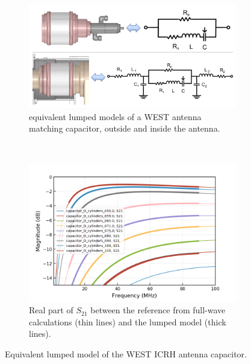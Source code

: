\documentclass{aip-cp}
\begin{document}
	\begin{figure}[t!]
		\centering
		\begin{subfigure}[t]{0.49\textwidth}
			\centering
			\includegraphics[width=.95\textwidth]{figures/capacitor_equivalent_circuit}
			\caption{equivalent lumped models of a WEST antenna matching capacitor, outside and inside the antenna.}
		\end{subfigure}%
		~
		\begin{subfigure}[t]{0.49\textwidth}
			\centering
			\includegraphics[width=\linewidth]{figures/comparison_fullwave_lumped_S21}
			\caption{Real part of $S_{21}$ between the reference from full-wave  calculations (thin lines) and the lumped model (thick lines).}
		\end{subfigure}
		\caption{Equivalent lumped model of the WEST ICRH antenna capacitor.}
		\label{fig:fig2}
	\end{figure}
	
	
\end{document}
